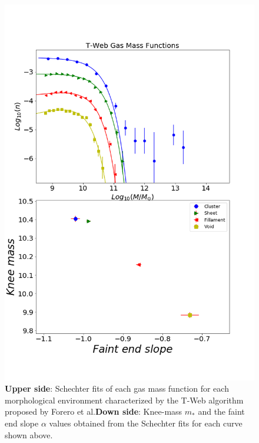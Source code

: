 \documentclass[a4paper,fleqn,usenatbib]{mnras}
\begin{document}
\begin{figure}
	\includegraphics[width=\columnwidth]{./pics/T-Web_Gas.png}
    \caption{\textbf{Upper side}: Schechter fits of each gas mass function for each morphological environment characterized by the T-Web algorithm proposed by Forero et al.\textbf{Down side}: Knee-mass $m_\ast$ and the faint end slope $\alpha$ values obtained from the Schechter fits for each curve shown above.}
    \label{fig:TwebGas}
\end{figure}
\end{document}
